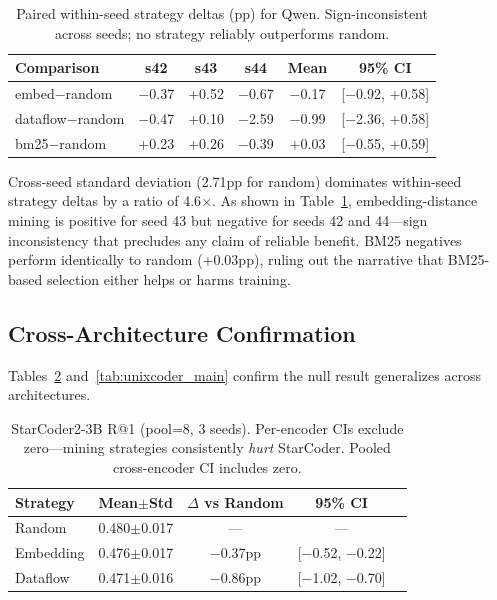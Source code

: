 \documentclass[11pt,a4paper]{article}
\begin{document}
\begin{table}[t]
\centering
\small
\begin{tabular}{lccccc}
\toprule
Comparison & s42 & s43 & s44 & Mean & 95\% CI \\
\midrule
embed$-$random & $-$0.37 & +0.52 & $-$0.67 & $-$0.17 & [$-$0.92, +0.58] \\
dataflow$-$random & $-$0.47 & +0.10 & $-$2.59 & $-$0.99 & [$-$2.36, +0.58] \\
bm25$-$random & +0.23 & +0.26 & $-$0.39 & +0.03 & [$-$0.55, +0.59] \\
\bottomrule
\end{tabular}
\caption{Paired within-seed strategy deltas (pp) for Qwen. Sign-inconsistent across seeds; no strategy reliably outperforms random.}
\label{tab:paired_deltas}
\end{table}

Cross-seed standard deviation (2.71pp for random) dominates within-seed strategy deltas by a ratio of 4.6$\times$.
As shown in Table~\ref{tab:paired_deltas}, embedding-distance mining is positive for seed 43 but negative for seeds 42 and 44---sign inconsistency that precludes any claim of reliable benefit.
BM25 negatives perform identically to random (+0.03pp), ruling out the narrative that BM25-based selection either helps or harms training.

\subsection{Cross-Architecture Confirmation}

Tables~\ref{tab:starcoder_main} and~\ref{tab:unixcoder_main} confirm the null result generalizes across architectures.

\begin{table}[t]
\centering
\small
\begin{tabular}{lcccc}
\toprule
Strategy & Mean$\pm$Std & $\Delta$ vs Random & 95\% CI \\
\midrule
Random & 0.480$\pm$0.017 & --- & --- \\
Embedding & 0.476$\pm$0.017 & $-$0.37pp & [$-$0.52, $-$0.22] \\
Dataflow & 0.471$\pm$0.016 & $-$0.86pp & [$-$1.02, $-$0.70] \\
\bottomrule
\end{tabular}
\caption{StarCoder2-3B R@1 (pool=8, 3 seeds). Per-encoder CIs exclude zero---mining strategies consistently \textit{hurt} StarCoder. Pooled cross-encoder CI includes zero.}
\label{tab:starcoder_main}
\end{table}
\end{document}
